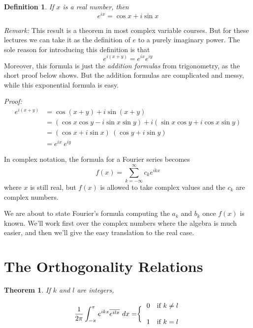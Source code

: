 \documentclass[11pt, oneside]{article}   	%
\newtheorem{theorem}{Theorem}
\newtheorem{definition}{Definition}
\begin{document}
\begin{definition} If $x$ is a real number, then
\[e^{ix} = \cos x + i \sin x\]
\end{definition}

{\em Remark:} This result is a theorem in most complex variable courses. But for these lectures we can take it as the definition of $e$ to a purely imaginary power. The sole reason for introducing this definition is that
\[e^{i(x + y)} = e^{ix} e^{iy}\]
Moreover, this formula is just the {\em addition formulas} from trigonometry, as the short proof below shows. But the addition formulas are complicated and messy, while this exponential formula is easy.

{\em Proof:}
\begin{align*}
e^{i(x + y)} &= \cos(x + y) + i \sin (x + y) \\
&=  \left( \cos x \cos y - i \sin x \sin y \right) + i \left( \sin x \cos y + i \cos x \sin y \right) \\
&= \left( \cos x + i \sin x \right) \ \left( \cos y + i \sin y \right)\\
&= e^{ix} \ e^{iy}
\end{align*}

In complex notation, the formula for a Fourier series becomes
\[f(x) = \sum_{k = - \infty}^\infty c_k e^{ikx}\]
 where $x$ is still real, but $f(x)$ is allowed to take complex values and the $c_k$ are complex numbers.
 
 We are about to state Fourier's  formula computing the $a_k$ and $b_k$ once $f(x)$ is known.
 We'll work first over the complex numbers where the algebra is much easier, and then we'll give the easy translation to the real case.
 
 \newpage
 
 \section{The Orthogonality Relations}
 
 \begin{theorem} If $k$ and $l$ are integers,

\[\left. {1 \over {2 \pi}} \int_{- \pi}^\pi e^{ikx} \overline{e^{ilx}}\ dx = \right\{ \begin{array}{ll} 0 & \mbox{if $k \ne l$} \\ \\ 1 & \mbox{if $k = l$} \end{array}\]
\end{theorem} 
\end{document}
